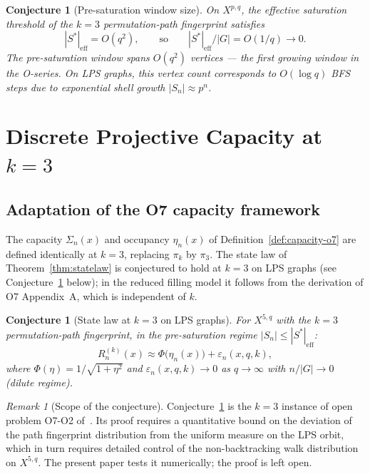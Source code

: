\documentclass[11pt,a4paper]{article}
\newtheorem{conjecture}[theorem]{Conjecture}
\theoremstyle{definition}
\theoremstyle{remark}
\newtheorem{remark}[theorem]{Remark}
\newcommand{\Rn}{R_n^{(k)}}
\newcommand{\etan}{\eta_n}
\newcommand{\Sigman}{\Sigma_n}
\begin{document}
    \begin{conjecture}[Pre-saturation window size]
      \label{conj:window}
      On $X^{p,q}$, the effective saturation threshold of the $k = 3$ permutation-path
      fingerprint satisfies
      \[
        |S^*|_\mathrm{eff} = O(q^2),
        \qquad \text{so} \qquad
        |S^*|_\mathrm{eff} / |G| = O(1/q) \to 0.
      \]
      The pre-saturation window spans $O(q^2)$ vertices — the first growing window
      in the O-series.
      On LPS graphs, this vertex count corresponds to $O(\log q)$ BFS steps due to
      exponential shell growth $|S_n| \approx p^n$.
    \end{conjecture}

  \section{Discrete Projective Capacity at $k = 3$}
  \label{sec:capacity}

  \subsection{Adaptation of the O7 capacity framework}
    \label{sec:capacity-adapt}

    The capacity $\Sigman(x)$ and occupancy $\etan(x)$ of Definition~\ref{def:capacity-o7}
    are defined identically at $k = 3$, replacing $\pi_k$ by $\pi_3$.
    The state law of Theorem~\ref{thm:statelaw} is conjectured to hold at $k = 3$ on
    LPS graphs (see Conjecture~\ref{conj:statelaw-k3} below); in the reduced filling
    model it follows from the derivation of O7 Appendix~A, which is independent of $k$.

    \begin{conjecture}[State law at $k = 3$ on LPS graphs]
      \label{conj:statelaw-k3}
      For $X^{5,q}$ with the $k = 3$ permutation-path fingerprint, in the pre-saturation
      regime $|S_n| \leq |S^*|_\mathrm{eff}$:
      \[
        \Rn(x) \approx \Phi\bigl(\etan(x)\bigr) + \varepsilon_n(x, q, k),
      \]
      where $\Phi(\eta) = 1/\sqrt{1+\eta^2}$ and $\varepsilon_n(x, q, k) \to 0$
      as $q \to \infty$ with $n/|G| \to 0$ (dilute regime).
    \end{conjecture}

    \begin{remark}[Scope of the conjecture]
      \label{rem:conjecture-scope}
      Conjecture~\ref{conj:statelaw-k3} is the $k = 3$ instance of open problem O7-O2
      of~\cite{Beau2026a11}.
      Its proof requires a quantitative bound on the deviation of the path fingerprint
      distribution from the uniform measure on the LPS orbit, which in turn requires
      detailed control of the non-backtracking walk distribution on $X^{5,q}$.
      The present paper tests it numerically; the proof is left open.
    \end{remark}
\end{document}
